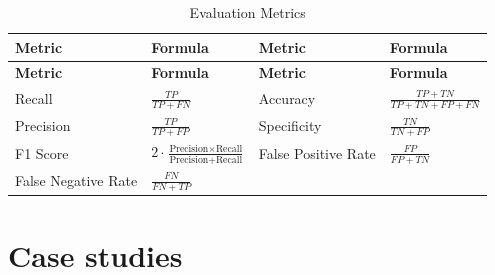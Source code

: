 \begin{longtable}[]{@{}
  >{\raggedright\arraybackslash}p{}
  >{\raggedright\arraybackslash}p{}
  >{\raggedright\arraybackslash}p{}
  >{\raggedright\arraybackslash}p{}@{}}
\caption{Evaluation Metrics}\tabularnewline
\toprule\noalign{}
\begin{minipage}[b]{\linewidth}\raggedright
\textbf{Metric}
\end{minipage} & \begin{minipage}[b]{\linewidth}\raggedright
\textbf{Formula}
\end{minipage} & \begin{minipage}[b]{\linewidth}\raggedright
\textbf{Metric}
\end{minipage} & \begin{minipage}[b]{\linewidth}\raggedright
\textbf{Formula}
\end{minipage} \\
\midrule\noalign{}
\endfirsthead
\toprule\noalign{}
\begin{minipage}[b]{\linewidth}\raggedright
\textbf{Metric}
\end{minipage} & \begin{minipage}[b]{\linewidth}\raggedright
\textbf{Formula}
\end{minipage} & \begin{minipage}[b]{\linewidth}\raggedright
\textbf{Metric}
\end{minipage} & \begin{minipage}[b]{\linewidth}\raggedright
\textbf{Formula}
\end{minipage} \\
\midrule\noalign{}
\endhead
\bottomrule\noalign{}
\endlastfoot
Recall & \(\frac{TP}{TP + FN}\) & Accuracy & \(\frac{TP + TN}{TP + TN + FP + FN}\) \\
Precision & \(\frac{TP}{TP + FP}\) & Specificity & \(\frac{TN}{TN + FP}\) \\
F1 Score & \(2 \cdot \frac{\text{Precision} \times \text{Recall}}{\text{Precision} + \text{Recall}}\) & False Positive Rate & \(\frac{FP}{FP + TN}\) \\
False Negative Rate & \(\frac{FN}{FN + TP}\) & & \\
\end{longtable}

\section{Case studies}\label{sec-case}


